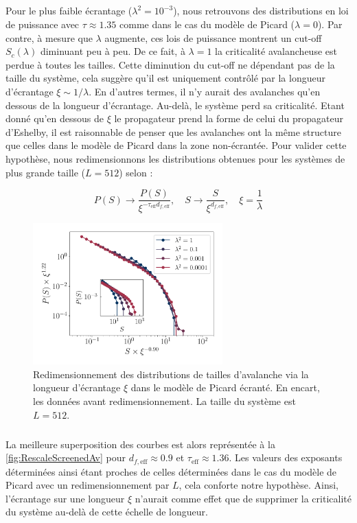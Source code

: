 \subparagraph{}Pour le plus faible écrantage ($\lambda^2 = 10^{-3}$), nous retrouvons des distributions en loi de puissance avec $\tau \approx 1.35$ comme dans le cas du modèle de Picard ($\lambda = 0$). Par contre, à mesure que $\lambda$ augmente, ces lois de puissance montrent un cut-off $S_c(\lambda)$ diminuant peu à peu. De ce fait, à $\lambda=1$ la criticalité avalancheuse est perdue à toutes les tailles. Cette diminution du cut-off ne dépendant pas de la taille du système, cela suggère qu'il est uniquement contrôlé par la longueur d'écrantage $\xi \sim 1/\lambda$. En d'autres termes, il n'y aurait des avalanches qu'en dessous de la longueur d'écrantage. Au-delà, le système perd sa criticalité. Etant donné qu'en dessous de $\xi$ le propagateur prend la forme de celui du propagateur d'Eshelby, il est raisonnable de penser que les avalanches ont la même structure que celles dans le modèle de Picard dans la zone non-écrantée. Pour valider cette hypothèse, nous redimensionnons les distributions obtenues pour les systèmes de plus grande taille ($L=512$) selon :

\begin{equation}
	P(S) \rightarrow \frac{P(S)}{\xi^{-\tau_\text{eff}d_{f,\text{eff}}}},\quad S\rightarrow \frac{S}{\xi^{d_{f,\text{eff}}}}, \quad \xi = \frac{1}{\lambda}
\end{equation}

\begin{figure}[h]
	\centering
	\includegraphics[width=0.65\textwidth]{Chapitre6/Figures/RescaleScreenedAv.pdf}
	
	\caption{Redimensionnement des distributions de tailles d'avalanche via la longueur d'écrantage $\xi$ dans le modèle de Picard écranté. En encart, les données avant redimensionnement. La taille du système est $L=512$.}
	\label{fig:RescaleScreenedAv}
\end{figure}

\subparagraph{}La meilleure superposition des courbes est alors représentée à la \autoref{fig:RescaleScreenedAv} pour $d_{f,\text{eff}}\approx 0.9$ et $\tau_\text{eff} \approx 1.36$. Les valeurs des exposants déterminées ainsi étant proches de celles déterminées dans le cas du modèle de Picard avec un redimensionnement par $L$, cela conforte notre hypothèse. Ainsi, l'écrantage sur une longueur $\xi$ n'aurait comme effet que de supprimer la criticalité du système au-delà de cette échelle de longueur.

